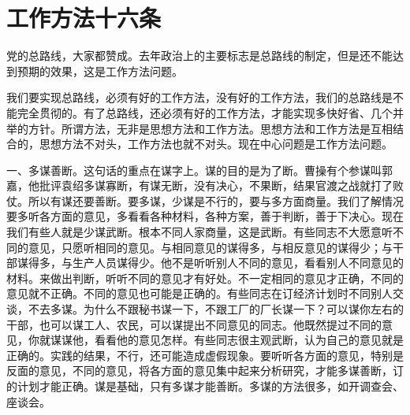 \section[工作方法十六条（一九五九年四月）]{工作方法十六条}


党的总路线，大家都赞成。去年政治上的主要标志是总路线的制定，但是还不能达到预期的效果，这是工作方法问题。

我们要实现总路线，必须有好的工作方法，没有好的工作方法，我们的总路线是不能完全贯彻的。有了总路线，还必须有好的工作方法，才能实现多快好省、几个并举的方针。所谓方法，无非是思想方法和工作方法。思想方法和工作方法是互相结合的，思想方法不对头，工作方法也就不对头。现在中心问题是工作方法问题。

一、多谋善断。这句话的重点在谋字上。谋的目的是为了断。曹操有个参谋叫郭嘉，他批评袁绍多谋寡断，有谋无断，没有决心，不果断，结果官渡之战就打了败仗。所以有谋还要善断。要多谋，少谋是不行的，要与多方面商量。我们了解情况要多听各方面的意见，多看看各种材料，各种方案，善于判断，善于下决心。现在我们有些人就是少谋武断。根本不同人家商量，这是武断。有些同志不大愿意听不同的意见，只愿听相同的意见。与相同意见的谋得多，与相反意见的谋得少；与干部谋得多，与生产人员谋得少。他不是听听别人不同的意见，看看别人不同意见的材料。来做出判断，听听不同的意见才有好处。不一定相同的意见才正确，不同的意见就不正确。不同的意见也可能是正确的。有些同志在订经济计划时不同别人交谈，不去多谋。为什么不跟秘书谋一下，不跟工厂的厂长谋一下？可以谋你左右的干部，也可以谋工人、农民，可以谋提出不同意见的同志。他既然提过不同的意见，你就谋谋他，看看他的意见怎样。有些同志很主观武断，认为自己的意见就是正确的。实践的结果，不行，还可能造成虚假现象。要听听各方面的意见，特别是反面的意见，不同的意见，将各方面的意见集中起来分析研究，才能多谋善断，订的计划才能正确。谋是基础，只有多谋才能善断。多谋的方法很多，如开调查会、座谈会。


